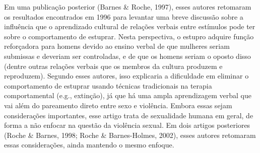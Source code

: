 Em uma publicação posterior (Barnes \& Roche, 1997), esses autores retomaram os resultados encontrados em 1996 para levantar uma breve discussão sobre a influência que o aprendizado cultural de relações verbais entre estímulos pode ter sobre o comportamento de estuprar. Nesta perspectiva, o estupro adquire função reforçadora para homens devido ao ensino verbal de que mulheres seriam submissas e deveriam ser controladas, e de que os homens seriam o oposto disso (dentre outras relações verbais que os membros da cultura produzem e reproduzem). Segundo esses autores, isso explicaria a dificuldade em eliminar o comportamento de estuprar usando técnicas tradicionais na terapia comportamental (e.g., extinção), já que há uma ampla aprendizagem verbal que vai além do pareamento direto entre sexo e violência. Embora essas sejam considerações importantes, esse artigo trata de sexualidade humana em geral, de forma a não enfocar na questão da violência sexual. Em dois artigos posteriores (Roche \& Barnes, 1998; Roche \& Barnes-Holmes, 2002), esses autores retomaram essas considerações, ainda mantendo o mesmo enfoque.

